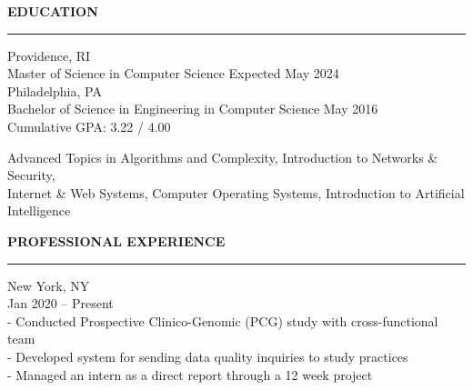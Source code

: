 \documentclass{resume} %
\begin{document}

\medskip
\MakeUppercase{\bf Education}
\medskip
\hrule

\hspace*{1mm}{\bf Brown University} \hfill Providence, RI \\
\hspace*{1mm}Master of Science in Computer Science \hfill Expected May 2024 \\

\hspace*{1mm}{\bf University of Pennsylvania} \hfill Philadelphia, PA \\
\hspace*{1mm}Bachelor of Science in Engineering in Computer Science \hfill May 2016 \\
\hspace*{1mm}Cumulative GPA: 3.22 / 4.00

\hspace*{1mm}{\em Relevant Courses:} Advanced Topics in Algorithms and Complexity, Introduction to Networks \& Security, \\
\hspace*{2mm}Internet \& Web Systems, Computer Operating Systems, Introduction to Artificial Intelligence




\medskip
\MakeUppercase{\bf Professional Experience}
\medskip
\hrule

\hspace*{1mm}{\bf Flatiron Health } \hfill New York, NY \\
\hspace*{1mm}{\em Senior Software Engineer, Clinical Research } \hfill Jan 2020 -- Present \\
\hspace*{3mm}- Conducted Prospective Clinico-Genomic (PCG) study with cross-functional team \\
\hspace*{3mm}- Developed system for sending data quality inquiries to study practices \\
\hspace*{3mm}- Managed an intern as a direct report through a 12 week project
\end{document}
